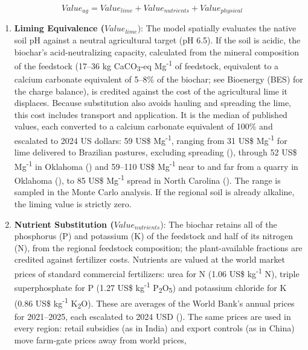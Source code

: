 \documentclass[
  letterpaper,
]{article}
\providecommand{\tightlist}{%
  \setlength{\itemsep}{0pt}\setlength{\parskip}{0pt}}\usepackage{longtable,booktabs,array}
\begin{document}
\[Value_{ag} = Value_{lime} + Value_{nutrients} + Value_{physical}\]

\begin{enumerate}
\def\labelenumi{\arabic{enumi}.}
\tightlist
\item
  \textbf{Liming Equivalence (}\(Value_{lime}\)): The model spatially
  evaluates the native soil pH against a neutral agricultural target (pH
  6.5). If the soil is acidic, the biochar's acid-neutralizing capacity,
  calculated from the mineral composition of the feedstock (17--36 kg
  CaCO\textsubscript{3}-eq Mg\textsuperscript{-1} of feedstock,
  equivalent to a calcium carbonate equivalent of 5--8\% of the biochar;
  see Bioenergy (BES) for the charge balance), is credited against the
  cost of the agricultural lime it displaces. Because substitution also
  avoids hauling and spreading the lime, this cost includes transport
  and application. It is the median of published values, each converted
  to a calcium carbonate equivalent of 100\% and escalated to 2024 US
  dollars: 59 US\$ Mg\textsuperscript{-1}, ranging from 31 US\$
  Mg\textsuperscript{-1} for lime delivered to Brazilian pastures,
  excluding spreading (), through
  52 US\$ Mg\textsuperscript{-1} in Oklahoma
  () and 59--110 US\$
  Mg\textsuperscript{-1} near to and far from a quarry in Oklahoma
  (), to 85 US\$
  Mg\textsuperscript{-1} spread in North Carolina
  (). The range is sampled in the
  Monte Carlo analysis. If the regional soil is already alkaline, the
  liming value is strictly zero.
\item
  \textbf{Nutrient Substitution (}\(Value_{nutrients}\)): The biochar
  retains all of the phosphorus (P) and potassium (K) of the feedstock
  and half of its nitrogen (N), from the regional feedstock composition;
  the plant-available fractions are credited against fertilizer costs.
  Nutrients are valued at the world market prices of standard commercial
  fertilizers: urea for N (1.06 US\$ kg\textsuperscript{-1} N), triple
  superphosphate for P (1.27 US\$ kg\textsuperscript{-1}
  P\textsubscript{2}O\textsubscript{5}) and potassium chloride for K
  (0.86 US\$ kg\textsuperscript{-1} K\textsubscript{2}O). These are
  averages of the World Bank's annual prices for 2021--2025, each
  escalated to 2024 USD
  (). The same prices
  are used in every region: retail subsidies (as in India) and export
  controls (as in China) move farm-gate prices away from world prices,

\end{enumerate}
\end{document}
